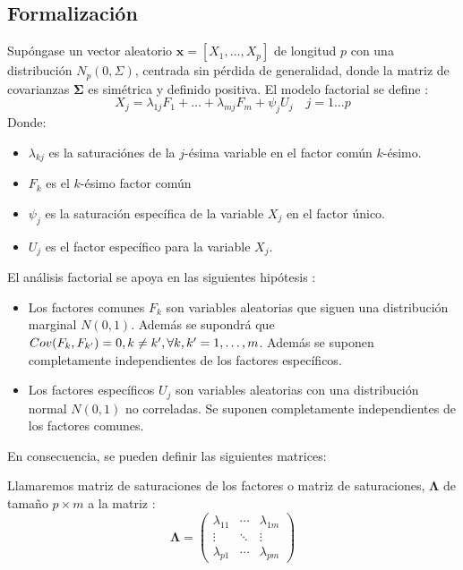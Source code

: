 \subsection{Formalización}
\noindent Supóngase un vector aleatorio $\mathbf{x}= [X_1, \ldots, X_p]$ de longitud $p$ con una distribución $N_p(0,\Sigma)$, centrada sin pérdida de generalidad, donde la matriz de covarianzas $\mathbf{\Sigma}$ es simétrica y definido positiva. El modelo factorial se define \cite{Chatfield 1989}:  
\begin{equation}\label{eq Fact}
X_j= \lambda_{1j}F_1+\ldots+\lambda_{mj}F_m+\psi_j U_j\quad j=1\ldots p 
\end{equation}
\noindent Donde:
\begin{itemize}
\item $\lambda_{kj}$ es la saturaciónes   de la $j$-ésima variable en el factor común $k$-ésimo. 
\item $F_k$ es el $k$-ésimo factor común
\item $\psi_j$ es la saturación  específica de la variable $X_j$ en el factor único. 
\item $U_j$ es el factor específico para la variable $X_j$.
\end{itemize}

\noindent El análisis factorial se apoya en las siguientes hipótesis \cite{Cuadras 2014}:
\begin{itemize}
\item Los factores comunes $F_k$ son variables aleatorias que siguen una distribución marginal $N(0,1)$. Además se supondrá que $Cov(F_k,F_{k'})=0, k\neq k',\\ \forall k,k'=1,\ldots, m$. Además se suponen completamente independientes de los factores específicos. 

\item Los factores específicos $U_j$ son variables aleatorias con una distribución normal $N(0,1)$ no correladas. Se suponen  completamente independientes de los factores comunes. 
\end{itemize}

\noindent En consecuencia, se pueden definir las siguientes matrices: 

\begin{defi}
Llamaremos matriz de saturaciones de los factores o matriz de saturaciones, $\mathbf{\Lambda}$ de tamaño $p \times m$ a la matriz :
\begin{equation}
\mathbf{\Lambda}=\begin{pmatrix}
\lambda_{11} & \cdots & \lambda_{1 m}\\
\vdots & \ddots & \vdots\\
\lambda_{p1} & \cdots & \lambda_{pm}
\end{pmatrix}
\end{equation}
\end{defi}

